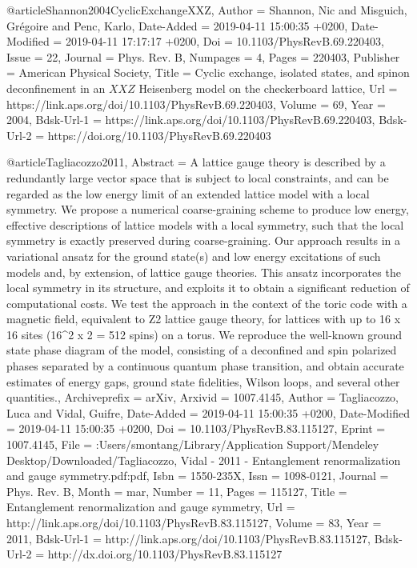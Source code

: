 \documentclass[epj,final]{svjour}
\begin{document}
{@article{Shannon2004CyclicExchangeXXZ,
	Author = {Shannon, Nic and Misguich, Gr\'egoire and Penc, Karlo},
	Date-Added = {2019-04-11 15:00:35 +0200},
	Date-Modified = {2019-04-11 17:17:17 +0200},
	Doi = {10.1103/PhysRevB.69.220403},
	Issue = {22},
	Journal = {Phys. Rev. B},
	Numpages = {4},
	Pages = {220403},
	Publisher = {American Physical Society},
	Title = {Cyclic exchange, isolated states, and spinon deconfinement in an {$XXZ$} {Heisenberg} model on the checkerboard lattice},
	Url = {https://link.aps.org/doi/10.1103/PhysRevB.69.220403},
	Volume = {69},
	Year = {2004},
	Bdsk-Url-1 = {https://link.aps.org/doi/10.1103/PhysRevB.69.220403},
	Bdsk-Url-2 = {https://doi.org/10.1103/PhysRevB.69.220403}}

@article{Tagliacozzo2011,
	Abstract = {A lattice gauge theory is described by a redundantly large vector space that is subject to local constraints, and can be regarded as the low energy limit of an extended lattice model with a local symmetry. We propose a numerical coarse-graining scheme to produce low energy, effective descriptions of lattice models with a local symmetry, such that the local symmetry is exactly preserved during coarse-graining. Our approach results in a variational ansatz for the ground state(s) and low energy excitations of such models and, by extension, of lattice gauge theories. This ansatz incorporates the local symmetry in its structure, and exploits it to obtain a significant reduction of computational costs. We test the approach in the context of the toric code with a magnetic field, equivalent to Z2 lattice gauge theory, for lattices with up to 16 x 16 sites (16{\^{}}2 x 2 = 512 spins) on a torus. We reproduce the well-known ground state phase diagram of the model, consisting of a deconfined and spin polarized phases separated by a continuous quantum phase transition, and obtain accurate estimates of energy gaps, ground state fidelities, Wilson loops, and several other quantities.},
	Archiveprefix = {arXiv},
	Arxivid = {1007.4145},
	Author = {Tagliacozzo, Luca and Vidal, Guifre},
	Date-Added = {2019-04-11 15:00:35 +0200},
	Date-Modified = {2019-04-11 15:00:35 +0200},
	Doi = {10.1103/PhysRevB.83.115127},
	Eprint = {1007.4145},
	File = {:Users/smontang/Library/Application Support/Mendeley Desktop/Downloaded/Tagliacozzo, Vidal - 2011 - Entanglement renormalization and gauge symmetry.pdf:pdf},
	Isbn = {1550-235X},
	Issn = {1098-0121},
	Journal = {Phys. Rev. B},
	Month = {mar},
	Number = {11},
	Pages = {115127},
	Title = {{Entanglement renormalization and gauge symmetry}},
	Url = {http://link.aps.org/doi/10.1103/PhysRevB.83.115127},
	Volume = {83},
	Year = {2011},
	Bdsk-Url-1 = {http://link.aps.org/doi/10.1103/PhysRevB.83.115127},
	Bdsk-Url-2 = {http://dx.doi.org/10.1103/PhysRevB.83.115127}}

}
\end{document}
